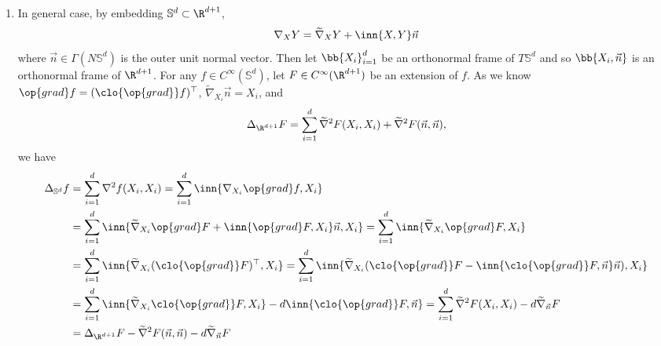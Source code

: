 \begin{enumerate}[label=\arabic{*}.]
    \item In general case, by embedding $\mathbb{S}^d \subset \R^{d+1}$, 
    \begin{equation*}
        \nabla_XY = \widetilde{\nabla}_XY + \inn{X,Y}\vec{n}
    \end{equation*}
    where $\vec{n} \in \Gamma(N\mathbb{S}^d)$ is the outer unit normal vector. Then let $\bb{X_i}_{i=1}^d$ be an orthonormal frame of $T\mathbb{S}^d$ and so $\bb{X_i,\vec{n}}$ is an orthonormal frame of $\R^{d+1}$. For any $f \in C^\infty(\mathbb{S}^d)$, let $F \in C^\infty(\R^{d+1})$ be an extension of $f$. As we know $\op{grad} f = (\clo{\op{grad}} f)^\top$, $\widetilde{\nabla}_{X_i}\vec{n} = X_i$, and
    \begin{equation*}
        \Delta_{\R^{d+1}} F = \sum_{i=1}^d \widetilde{\nabla}^2F(X_i,X_i) + \widetilde{\nabla}^2F(\vec{n},\vec{n}),
    \end{equation*}
    we have
    \begin{align*}
        \Delta_{\mathbb{S}^d}f &= \sum_{i=1}^d \nabla^2f(X_i,X_i) = \sum_{i=1}^d \inn{\nabla_{X_i} \op{grad}f,X_i} \\
        &=  \sum_{i=1}^d \inn{\widetilde{\nabla}_{X_i} \op{grad}F + \inn{\op{grad}F,X_i}\vec{n},X_i} =\sum_{i=1}^d \inn{\widetilde{\nabla}_{X_i} \op{grad}F,X_i} \\
        &= \sum_{i=1}^d \inn{\widetilde{\nabla}_{X_i}(\clo{\op{grad}}F)^\top,X_i} = \sum_{i=1}^d \inn{\widetilde{\nabla}_{X_i}(\clo{\op{grad}}F - \inn{\clo{\op{grad}}F,\vec{n}}\vec{n}),X_i} \\
        &= \sum_{i=1}^d \inn{\widetilde{\nabla}_{X_i}\clo{\op{grad}}F,X_i} - d \inn{\clo{\op{grad}}F, \vec n} = \sum_{i=1}^d \widetilde{\nabla}^2 F(X_i,X_i) - d \widetilde{\nabla}_{\vec{n}}F \\
        &= \Delta_{\R^{d+1}} F - \widetilde{\nabla}^2F(\vec{n},\vec{n}) - d \widetilde{\nabla}_{\vec{n}}F
    \end{align*}


\end{enumerate}

